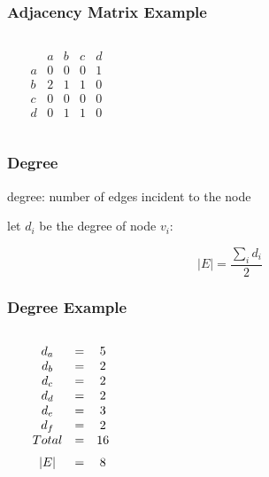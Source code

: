 \documentclass[dvipsnames]{beamer}
\begin{document}
\begin{frame}
  \frametitle{Adjacency Matrix Example}

  \begin{example}
    \begin{columns}
    \begin{center}
    \end{center}

      \[
        \begin{array}{c|cccc}
              & a & b & c & d\\\hline
            a & 0 & 0 & 0 & 1\\
            b & 2 & 1 & 1 & 0\\
            c & 0 & 0 & 0 & 0\\
            d & 0 & 1 & 1 & 0
        \end{array}
      \]
    \end{columns}
  \end{example}
\end{frame}

\begin{frame}
  \frametitle{Degree}

  \begin{definition}
    \alert{degree}: number of edges incident to the node
  \end{definition}

  \pause
  \begin{theorem}
    let $d_i$ be the degree of node $v_i$:

    \[ |E| = \frac{\sum_i d_i}{2} \]
  \end{theorem}
\end{frame}

\begin{frame}
  \frametitle{Degree Example}

  \begin{example}
    \begin{columns}
      \begin{center}
      \end{center}

      $\begin{array}{ccc}
      d_a & = & 5\\
      d_b & = & 2\\
      d_c & = & 2\\
      d_d & = & 2\\
      d_e & = & 3\\
      d_f & = & 2\\
      \medskip
      Total & = & 16\\
      \medskip
      |E| & = & 8
      \end{array}$
    \end{columns}
  \end{example}
\end{frame}
\end{document}
